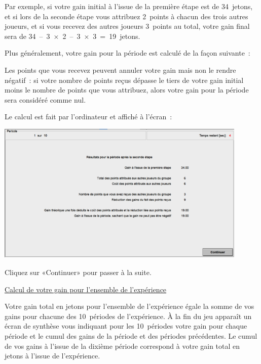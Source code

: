 \begin{Article}
\begin{refsection}[Lebourges]
\begin{appendices}
Par exemple, si votre gain initial à l'issue de la première étape est de
34~jetons, et si lors de la seconde étape vous attribuez 2~points à
chacun des trois autres joueurs, et si vous recevez des autres joueurs
3~points au total, votre gain final sera de
34~--~3~×~2~--~3~×~3~=~19~jetons.

Plus généralement, votre gain pour la période est calculé de la façon
suivante~:

\begin{center}
\noindent{}
\end{center}

Les points que vous recevez peuvent annuler votre gain mais non le
rendre négatif~: si votre nombre de points reçus dépasse le tiers de
votre gain initial moins le nombre de points que vous attribuez, alors
votre gain pour la période sera considéré comme nul.

Le calcul est fait par l'ordinateur et affiché à l'écran~:

\vspace{0,2cm}

\includegraphics[width = 0.9\textwidth]{05_fig8-annexII.png}

Cliquez sur «Continuer» pour passer à la suite.
\vspace{0,2cm}

\ul{Calcul de votre gain pour l'ensemble de l'expérience}

\vspace{0,2cm}
Votre gain total en jetons pour l'ensemble de l'expérience égale la
somme de vos gains pour chacune des 10~périodes de l'expérience. À la
fin du jeu apparaît un écran de synthèse vous indiquant pour les
10~périodes votre gain pour chaque période et le cumul des gains de la
période et des périodes précédentes. Le cumul de vos gains à l'issue de
la dixième période correspond à votre gain total en jetons à l'issue de
l'expérience.


\end{appendices}
\end{refsection}
\end{Article}

